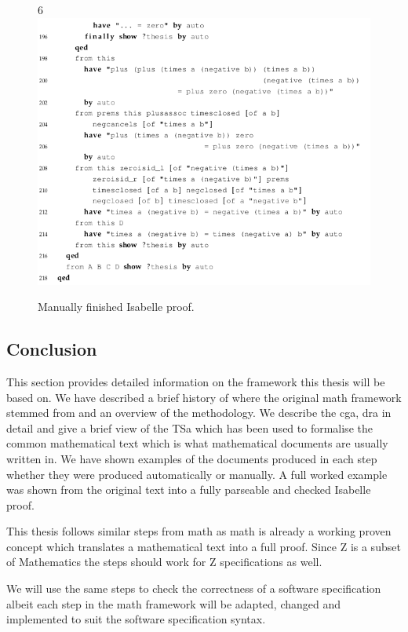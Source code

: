 \begin{figure}[H]
\begin{center}
6\includegraphics[scale=0.6]{Figures/Background/ringfull8.png}
\end{center}
\caption{Manually finished Isabelle proof. \label{fig:ringfull}}
\end{figure}

\subsection{Conclusion}

This section provides detailed information on the framework this thesis will be
based on. We have described a brief history of where the original \gls{math}
framework stemmed from and an overview of the methodology. We describe the
\gls{cga}, \gls{dra} in detail and give a brief view of the TSa which has been
used to formalise the common mathematical text which is what mathematical
documents are usually written in. We have shown examples of the documents
produced in each step whether they were produced automatically or manually. A
full worked example was shown from the original text into a fully parseable and
checked Isabelle proof.

This thesis follows similar steps from \gls{math} as \gls{math} is already a
working proven concept which translates a mathematical text into a full proof.
Since Z is a subset of Mathematics the steps should work for Z specifications as
well.

We will use the same steps to check the correctness of a software specification
albeit each step in the \gls{math} framework will be adapted, changed and
implemented to suit the software specification syntax.



